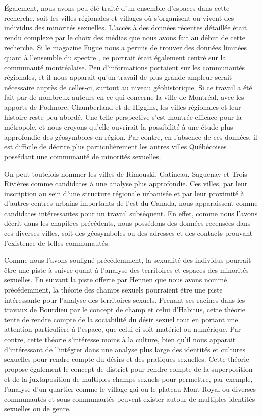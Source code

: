 Également, nous avons peu été traité d'un ensemble d'espaces dans cette recherche, soit les villes régionales et villages où s'organisent ou vivent des individus des minorités sexuelles.
L'accès à des données récentes détaillée était rendu complexe par le choix des médias que nous avons fait au début de cette recherche.
Si le magazine Fugue nous a permis de trouver des données limitées quant à l'ensemble du spectre \lgbt, ce portrait était également centré sur la communauté montréalaise.
Peu d'informations portaient sur les communautés régionales, et il nous apparait qu'un travail de plus grande ampleur serait nécessaire auprès de celles-ci, surtout au niveau géohistorique.
Si ce travail a été fait par de nombreux auteurs en ce qui concerne la ville de Montréal, avec les apports de Podmore, Chamberland et de Higgins, les villes régionales et leur histoire reste peu abordé.
Une telle perspective s'est montrée efficace pour la métropole, et nous croyons qu'elle ouvrirait la possibilité à une étude plus approfondie des géosymboles en région. 
Par contre, en l'absence de ces données, il est difficile de décrire plus particulièrement les autres villes Québécoises possédant une communauté de minorités sexuelles.

On peut toutefois nommer les villes de Rimouski, Gatineau, Saguenay et Trois-Rivières comme candidates à une analyse plus approfondie.
Ces villes, par leur inscription au sein d'une structure régionale urbanisée et par leur proximité à d'autres centres urbains importants de l'est du Canada, nous apparaissent comme candidates intéressantes pour un travail subséquent.
En effet, comme nous l'avons décrit dans les chapitres précédents, nous possédons des données recensées dans ces diverses villes, soit des géosymboles ou des adresses et des contacts prouvant l'existence de telles communautés.

Comme nous l'avons souligné précédemment, la sexualité des individus pourrait être une piste à suivre quant à l'analyse des territoires et espaces des minorités sexuelles.
En suivant la piste offerte par Hennen que nous avons nommé précédemment, la théorie des champs sexuels pourraient être une piste intéressante pour l'analyse des territoires sexuels.
Prenant ses racines dans les travaux de Bourdieu par le concept de champ et celui d'Habitus, cette théorie tente de rendre compte de la sociabilité du désir sexuel tout en portant une attention particulière à l'espace, que celui-ci soit matériel ou numérique.
Par contre, cette théorie s'intéresse moins à la culture, bien qu'il nous apparait d'intéressant de l'intégrer dans une analyse plus large des identités et cultures sexuelles pour rendre compte du désirs et des pratiques sexuelles.
Cette théorie propose également le concept de district pour rendre compte de la superposition et de la juxtaposition de multiples champs sexuels pour permettre, par exemple, l'analyse d'un quartier comme le village gai ou le plateau Mont-Royal ou diverses communautés et sous-communautés peuvent exister autour de multiples identités sexuelles ou de genre.


